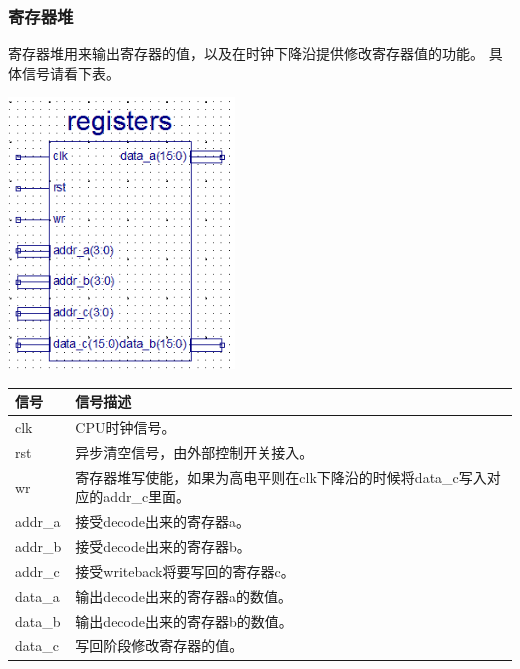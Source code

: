 \subsubsection{寄存器堆}
    寄存器堆用来输出寄存器的值，以及在时钟下降沿提供修改寄存器值的功能。
    具体信号请看下表。
\begin{center}
    \includegraphics[width=6cm]{image/detail/detail_register.png}
    \label{fig:register}
\end{center}
\begin{center}
    \label{table:register}
    \begin{longtable}{p{}p{}}
        \toprule
        信号 & 信号描述 \\
        \midrule
            clk & CPU时钟信号。\\
            rst &  异步清空信号，由外部控制开关接入。\\
            wr & 寄存器堆写使能，如果为高电平则在clk下降沿的时候将data\_c写入对应的addr\_c里面。\\
            addr\_a & 接受decode出来的寄存器a。\\
            addr\_b & 接受decode出来的寄存器b。\\
            addr\_c & 接受writeback将要写回的寄存器c。\\
            data\_a & 输出decode出来的寄存器a的数值。\\
            data\_b & 输出decode出来的寄存器b的数值。\\
            data\_c & 写回阶段修改寄存器的值。\\
        \bottomrule
    \end{longtable}
\end{center}


